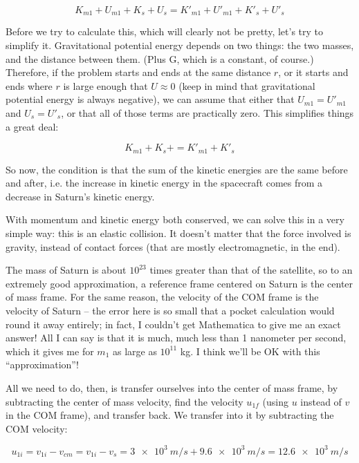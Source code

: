 \documentclass[8.01x]{subfiles}
\begin{document}
\begin{equation}
K_{m1} + U_{m1} + K_s + U_{s} = K'_{m1} + U'_{m1} + K'_s + U'_{s}
\end{equation}

Before we try to calculate this, which will clearly not be pretty, let's try to simplify it. Gravitational potential energy depends on two things: the two masses, and the distance between them. (Plus G, which is a constant, of course.) Therefore, if the problem starts and ends at the same distance $r$, or it starts and ends where $r$ is large enough that $U \approx 0$ (keep in mind that gravitational potential energy is always negative), we can assume that either that $U_{m1} = U'_{m1}$ and $U_s = U'_s$, or that all of those terms are practically zero. This simplifies things a great deal:

\begin{equation}
K_{m1} + K_s + = K'_{m1} + K'_s
\end{equation}

So now, the condition is that the sum of the kinetic energies are the same before and after, i.e. the increase in kinetic energy in the spacecraft comes from a decrease in Saturn's kinetic energy. 

With momentum and kinetic energy both conserved, we can solve this in a very simple way: this is an elastic collision. It doesn't matter that the force involved is gravity, instead of contact forces (that are mostly electromagnetic, in the end).

The mass of Saturn is about $10^{23}$ times greater than that of the satellite, so to an extremely good approximation, a reference frame centered on Saturn is the center of mass frame. For the same reason, the velocity of the COM frame is the velocity of Saturn -- the error here is so small that a pocket calculation would round it away entirely; in fact, I couldn't get Mathematica to give me an exact answer! All I can say is that it is much, much less than 1 nanometer per second, which it gives me for $m_1$ as large as $10^{11}$ kg. I think we'll be OK with this ``approximation''!

All we need to do, then, is transfer ourselves into the center of mass frame, by subtracting the center of mass velocity, find the velocity $u_{1f}$ (using $u$ instead of $v$ in the COM frame), and transfer back. We transfer into it by subtracting the COM velocity:

\begin{equation}
u_{1i} = v_{1i} - v_{cm} = v_{1i} - v_s = \SI{3e3}{m/s} + \SI{9.6e3}{m/s} = \SI{12.6e3}{m/s}
\end{equation}
\end{document}
